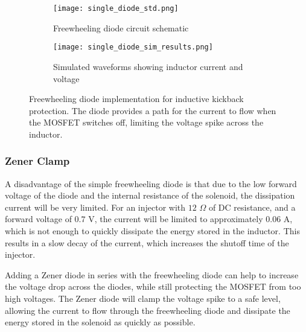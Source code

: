                 \begin{figure}[H]
                    \centering
                    \begin{subfigure}{0.25\textwidth}
                        \centering
                        \texttt{[image: single\_diode\_std.png]}
                        \caption{Freewheeling diode circuit schematic}
                        \label{fig:freewheeling_circuit}
                    \end{subfigure}
                    \hfill
                    \begin{subfigure}{0.7\textwidth}
                        \centering
                        \texttt{[image: single\_diode\_sim\_results.png]}
                        \caption{Simulated waveforms showing inductor current and voltage}
                        \label{fig:freewheeling_waveform}
                    \end{subfigure}
                    \caption{Freewheeling diode implementation for inductive kickback protection. The diode provides a path for the current to flow when the MOSFET switches off, limiting the voltage spike across the inductor.}
                    \label{fig:freewheeling_combined}
                \end{figure}


            \subsubsection{Zener Clamp}

                A disadvantage of the simple freewheeling diode is that due to the low forward voltage of the diode and the internal resistance of the solenoid, the dissipation current will be very limited. For an injector with $12$ $\Omega$ of DC resistance, and a forward voltage of $0.7$ V, the current will be limited to approximately $0.06$ A, which is not enough to quickly dissipate the energy stored in the inductor. This results in a slow decay of the current, which increases the shutoff time of the injector. 

                Adding a Zener diode in series with the freewheeling diode can help to increase the voltage drop across the diodes, while still protecting the MOSFET from too high voltages. The Zener diode will clamp the voltage spike to a safe level, allowing the current to flow through the freewheeling diode and dissipate the energy stored in the solenoid as quickly as possible.

